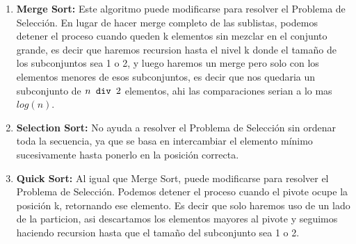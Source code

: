 \documentclass[answers, 10pt]{exam}
\begin{document}
\begin{questions}

  \begin{solution}
    \begin{enumerate}
      \item \textbf{Merge Sort:} Este algoritmo puede modificarse para resolver el
            Problema de Selección. En lugar de hacer merge completo de las sublistas,
            podemos detener el proceso cuando queden k elementos sin mezclar en
            el conjunto grande, es decir que haremos recursion hasta el nivel k donde
            el tamaño de los subconjuntos sea 1 o 2, y luego haremos un merge pero solo
            con los elementos menores de esos subconjuntos, es decir que nos quedaria un subconjunto
            de $n \verb| div | 2$ elementos, ahi las comparaciones serian a lo mas $log (n)$.

      \item \textbf{Selection Sort:} No ayuda a resolver el Problema de Selección sin
            ordenar toda la secuencia, ya que se basa en intercambiar el elemento
            mínimo sucesivamente hasta ponerlo en la posición correcta.

      \item \textbf{Quick Sort:} Al igual que Merge Sort, puede modificarse para
            resolver el Problema de Selección. Podemos detener el proceso cuando el
            pivote ocupe la posición k, retornando ese elemento. Es decir que solo
            haremos uso de un lado de la particion, asi descartamos los elementos mayores
            al pivote y seguimos haciendo recursion hasta que el tamaño del subconjunto sea 1 o 2.


\end{enumerate}
\end{solution}
\end{questions}
\end{document}
